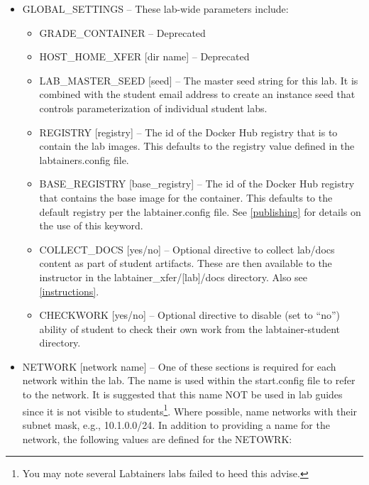 \documentclass[12pt]{article}
\begin{document}
\begin{itemize}
\item GLOBAL\_SETTINGS -- These lab-wide parameters include:

\begin{itemize}
\item GRADE\_CONTAINER -- Deprecated
\item HOST\_HOME\_XFER [dir name] --  Deprecated
\item LAB\_MASTER\_SEED [seed] -- The master seed string for this lab.  It is combined with the student email
address to create an instance seed that controls parameterization of individual student labs.
\item REGISTRY [registry] -- The id of the Docker Hub registry that is to contain the lab images. This defaults to the
registry value defined in the labtainers.config file.
\item BASE\_REGISTRY [base\_registry] -- The id of the Docker Hub registry that contains the base image for the container.  This defaults
to the default registry per the labtainer.config file.
See \ref{publishing} for details on the use of this keyword.
\item COLLECT\_DOCS [yes/no] -- Optional directive to collect lab/docs content as part of student artifacts.
These are then available to the instructor in the labtainer\_xfer/[lab]/docs directory.  Also see \ref{instructions}.
\item CHECKWORK [yes/no] -- Optional directive to disable (set to ``no'') ability of student to check their own work from the labtainer-student directory.
\end{itemize}

\item NETWORK [network name] -- One of these sections is required for each network within the lab.  The name
is used within the start.config file to refer to the network.  It is suggested that this name NOT be
used in lab guides since it is not visible to students\footnote{You may note several Labtainers labs
failed to heed this advise.}. Where possible, name networks with their subnet mask, e.g., 10.1.0.0/24.
In addition to providing a name for the network, the following values are defined for the NETOWRK:


\end{itemize}
\end{document}
